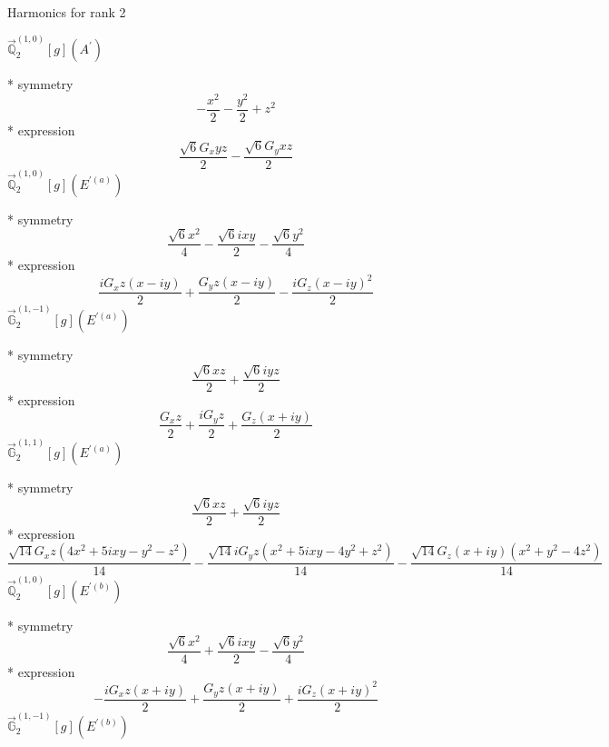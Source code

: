 \documentclass[fleqn,8pt]{jsarticle}
\begin{document}
\noindent * Harmonics for rank 2

\noindent\quad $\vec{\mathbb{Q}}_{2}^{(1,0)}[g](A^{\prime})$

\noindent\quad ** symmetry
\begin{dmath*}
- \frac{x^{2}}{2} - \frac{y^{2}}{2} + z^{2}
\end{dmath*}
\noindent\quad ** expression
\begin{dmath*}
\frac{\sqrt{6} G_{x} y z}{2} - \frac{\sqrt{6} G_{y} x z}{2}
\end{dmath*}
\noindent\quad $\vec{\mathbb{Q}}_{2}^{(1,0)}[g](E^{\prime(a)})$

\noindent\quad ** symmetry
\begin{dmath*}
\frac{\sqrt{6} x^{2}}{4} - \frac{\sqrt{6} i x y}{2} - \frac{\sqrt{6} y^{2}}{4}
\end{dmath*}
\noindent\quad ** expression
\begin{dmath*}
\frac{i G_{x} z \left(x - i y\right)}{2} + \frac{G_{y} z \left(x - i y\right)}{2} - \frac{i G_{z} \left(x - i y\right)^{2}}{2}
\end{dmath*}
\noindent\quad $\vec{\mathbb{G}}_{2}^{(1,-1)}[g](E^{\prime(a)})$

\noindent\quad ** symmetry
\begin{dmath*}
\frac{\sqrt{6} x z}{2} + \frac{\sqrt{6} i y z}{2}
\end{dmath*}
\noindent\quad ** expression
\begin{dmath*}
\frac{G_{x} z}{2} + \frac{i G_{y} z}{2} + \frac{G_{z} \left(x + i y\right)}{2}
\end{dmath*}
\noindent\quad $\vec{\mathbb{G}}_{2}^{(1,1)}[g](E^{\prime(a)})$

\noindent\quad ** symmetry
\begin{dmath*}
\frac{\sqrt{6} x z}{2} + \frac{\sqrt{6} i y z}{2}
\end{dmath*}
\noindent\quad ** expression
\begin{dmath*}
\frac{\sqrt{14} G_{x} z \left(4 x^{2} + 5 i x y - y^{2} - z^{2}\right)}{14} - \frac{\sqrt{14} i G_{y} z \left(x^{2} + 5 i x y - 4 y^{2} + z^{2}\right)}{14} - \frac{\sqrt{14} G_{z} \left(x + i y\right) \left(x^{2} + y^{2} - 4 z^{2}\right)}{14}
\end{dmath*}
\noindent\quad $\vec{\mathbb{Q}}_{2}^{(1,0)}[g](E^{\prime(b)})$

\noindent\quad ** symmetry
\begin{dmath*}
\frac{\sqrt{6} x^{2}}{4} + \frac{\sqrt{6} i x y}{2} - \frac{\sqrt{6} y^{2}}{4}
\end{dmath*}
\noindent\quad ** expression
\begin{dmath*}
- \frac{i G_{x} z \left(x + i y\right)}{2} + \frac{G_{y} z \left(x + i y\right)}{2} + \frac{i G_{z} \left(x + i y\right)^{2}}{2}
\end{dmath*}
\noindent\quad $\vec{\mathbb{G}}_{2}^{(1,-1)}[g](E^{\prime(b)})$
\end{document}
